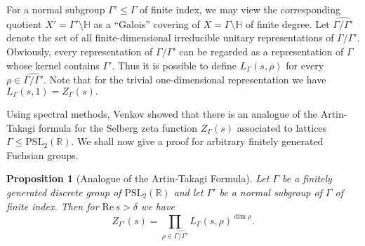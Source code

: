 \documentclass[12pt]{article}
\newtheorem{prop}[thm]{Proposition}
\newcommand{\RR}{\mathbb{R}}
\newcommand{\R}{\mathrm{Re}\,}
\newcommand{\HH}{\mathbb{H}}
\begin{document}
For a normal subgroup $ \Gamma'\leqslant \Gamma $ of finite index, we may view the corresponding   quotient $ X'=\Gamma'\setminus \HH $ as a ``Galois'' covering of $ X=\Gamma\setminus\HH $ of finite degree. Let $ \widehat{\Gamma/\Gamma'} $ denote the set of all finite-dimensional irreducible unitary representations of $ \Gamma/\Gamma' $. Obviously, every representation of $ \Gamma/\Gamma' $ can be regarded as a representation of $ \Gamma $ whose kernel contains $ \Gamma' $. Thus it is possible to define $ L_{\Gamma}(s, \rho) $ for every $ \rho\in \widehat{\Gamma/\Gamma'}. $ Note that for the trivial one-dimensional representation we have  $ L_{\Gamma}(s,1) = Z_{\Gamma}(s). $

Using spectral methods, Venkov \cite{Venkov} showed that there is an analogue of the Artin-Takagi formula for the Selberg zeta function $ Z_{\Gamma}(s) $ associated to lattices $ \Gamma\leqslant \mathrm{PSL}_{2}(\RR) $. We shall now give a proof for arbitrary finitely generated Fuchsian groups.

\begin{prop}[Analogue of the Artin-Takagi Formula]\label{Analogue of the Artin-Takagi Formula} Let $ \Gamma $ be a finitely generated discrete group of $ \mathrm{PSL}_{2}(\mathbb{R}) $ and let $ \Gamma' $ be a normal subgroup of $ \Gamma $ of finite index. Then for $ \R s > \delta $ we have 
$$ Z_{\Gamma'}(s) = \prod_{\rho\in \widehat{\Gamma/\Gamma'}} L_{\Gamma}(s,\rho)^{\dim \rho}. $$
\end{prop}
\end{document}
